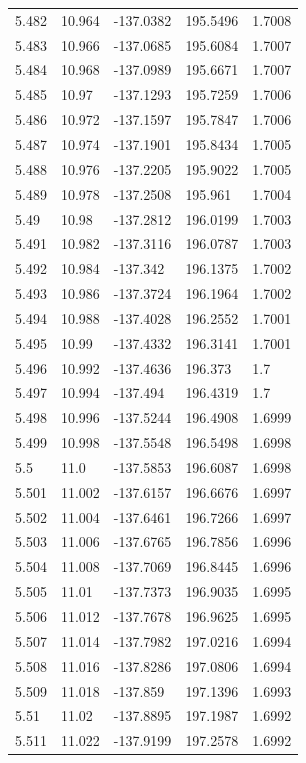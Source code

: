 \begin{tabular}{lllll}
5.482 & 10.964 & -137.0382 & 195.5496 & 1.7008 \\
5.483 & 10.966 & -137.0685 & 195.6084 & 1.7007 \\
5.484 & 10.968 & -137.0989 & 195.6671 & 1.7007 \\
5.485 & 10.97 & -137.1293 & 195.7259 & 1.7006 \\
5.486 & 10.972 & -137.1597 & 195.7847 & 1.7006 \\
5.487 & 10.974 & -137.1901 & 195.8434 & 1.7005 \\
5.488 & 10.976 & -137.2205 & 195.9022 & 1.7005 \\
5.489 & 10.978 & -137.2508 & 195.961 & 1.7004 \\
5.49 & 10.98 & -137.2812 & 196.0199 & 1.7003 \\
5.491 & 10.982 & -137.3116 & 196.0787 & 1.7003 \\
5.492 & 10.984 & -137.342 & 196.1375 & 1.7002 \\
5.493 & 10.986 & -137.3724 & 196.1964 & 1.7002 \\
5.494 & 10.988 & -137.4028 & 196.2552 & 1.7001 \\
5.495 & 10.99 & -137.4332 & 196.3141 & 1.7001 \\
5.496 & 10.992 & -137.4636 & 196.373 & 1.7 \\
5.497 & 10.994 & -137.494 & 196.4319 & 1.7 \\
5.498 & 10.996 & -137.5244 & 196.4908 & 1.6999 \\
5.499 & 10.998 & -137.5548 & 196.5498 & 1.6998 \\
5.5 & 11.0 & -137.5853 & 196.6087 & 1.6998 \\
5.501 & 11.002 & -137.6157 & 196.6676 & 1.6997 \\
5.502 & 11.004 & -137.6461 & 196.7266 & 1.6997 \\
5.503 & 11.006 & -137.6765 & 196.7856 & 1.6996 \\
5.504 & 11.008 & -137.7069 & 196.8445 & 1.6996 \\
5.505 & 11.01 & -137.7373 & 196.9035 & 1.6995 \\
5.506 & 11.012 & -137.7678 & 196.9625 & 1.6995 \\
5.507 & 11.014 & -137.7982 & 197.0216 & 1.6994 \\
5.508 & 11.016 & -137.8286 & 197.0806 & 1.6994 \\
5.509 & 11.018 & -137.859 & 197.1396 & 1.6993 \\
5.51 & 11.02 & -137.8895 & 197.1987 & 1.6992 \\
5.511 & 11.022 & -137.9199 & 197.2578 & 1.6992 \\

\end{tabular}
